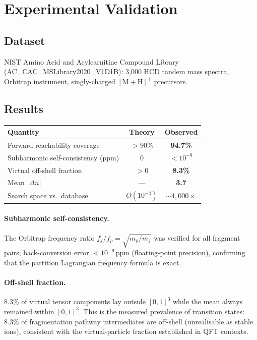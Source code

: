 \documentclass[twocolumn,10pt,a4paper]{article}
\theoremstyle{thmstyle}
\theoremstyle{definition}
\theoremstyle{remark}
\begin{document}
\section{Experimental Validation}
\label{sec:validation}

\subsection{Dataset}

NIST Amino Acid and Acylcarnitine Compound Library
(AC\_CAC\_MSLibrary2020\_V1D1B): 3{,}000 HCD tandem mass spectra,
Orbitrap instrument, singly-charged $[\mathrm{M+H}]^+$ precursors.

\subsection{Results}

\begin{center}\small
\begin{tabular}{lcc}
\toprule
\textbf{Quantity} & \textbf{Theory} & \textbf{Observed} \\
\midrule
Forward reachability coverage & $>90\%$ & \textbf{94.7\%} \\
Subharmonic self-consistency (ppm) & $0$ & $<10^{-9}$ \\
Virtual off-shell fraction & $>0$ & \textbf{8.3\%} \\
Mean $|\Delta n|$ & --- & \textbf{3.7} \\
Search space vs.\ database & $O(10^{-4})$ & $\sim 4{,}000\times$ \\
\bottomrule
\end{tabular}
\end{center}

\paragraph{Subharmonic self-consistency.}
The Orbitrap frequency ratio $f_f/f_p = \sqrt{m_p/m_f}$ was verified for
all fragment pairs; back-conversion error $< 10^{-9}$\,ppm (floating-point
precision), confirming that the partition Lagrangian frequency formula is
exact.

\paragraph{Off-shell fraction.}
8.3\% of virtual tensor components lay outside $[0,1]^3$ while the mean
always remained within $[0,1]^3$.  This is the measured prevalence of
transition states: 8.3\% of fragmentation pathway intermediates are
off-shell (unrealisable as stable ions), consistent with the virtual-particle
fraction established in QFT contexts.
\end{document}
